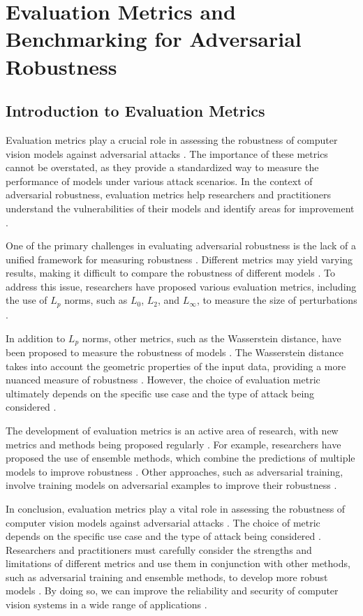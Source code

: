 \documentclass[11pt]{article}
\begin{document}
\section{Evaluation Metrics and Benchmarking for Adversarial Robustness}

\subsection{Introduction to Evaluation Metrics}

Evaluation metrics play a crucial role in assessing the robustness of computer vision models against adversarial attacks \cite{ref140}. The importance of these metrics cannot be overstated, as they provide a standardized way to measure the performance of models under various attack scenarios. In the context of adversarial robustness, evaluation metrics help researchers and practitioners understand the vulnerabilities of their models and identify areas for improvement \cite{ref16}.

One of the primary challenges in evaluating adversarial robustness is the lack of a unified framework for measuring robustness \cite{ref141}. Different metrics may yield varying results, making it difficult to compare the robustness of different models \cite{ref142}. To address this issue, researchers have proposed various evaluation metrics, including the use of \(L_p\) norms, such as \(L_0\), \(L_2\), and \(L_\infty\), to measure the size of perturbations \cite{ref141}.

In addition to \(L_p\) norms, other metrics, such as the Wasserstein distance, have been proposed to measure the robustness of models \cite{ref143}. The Wasserstein distance takes into account the geometric properties of the input data, providing a more nuanced measure of robustness \cite{ref144}. However, the choice of evaluation metric ultimately depends on the specific use case and the type of attack being considered \cite{ref21}.

The development of evaluation metrics is an active area of research, with new metrics and methods being proposed regularly \cite{ref145}. For example, researchers have proposed the use of ensemble methods, which combine the predictions of multiple models to improve robustness \cite{ref146}. Other approaches, such as adversarial training, involve training models on adversarial examples to improve their robustness \cite{ref147}.

In conclusion, evaluation metrics play a vital role in assessing the robustness of computer vision models against adversarial attacks \cite{ref148}. The choice of metric depends on the specific use case and the type of attack being considered \cite{ref6}. Researchers and practitioners must carefully consider the strengths and limitations of different metrics and use them in conjunction with other methods, such as adversarial training and ensemble methods, to develop more robust models \cite{ref149}. By doing so, we can improve the reliability and security of computer vision systems in a wide range of applications \cite{ref150}.
\end{document}

